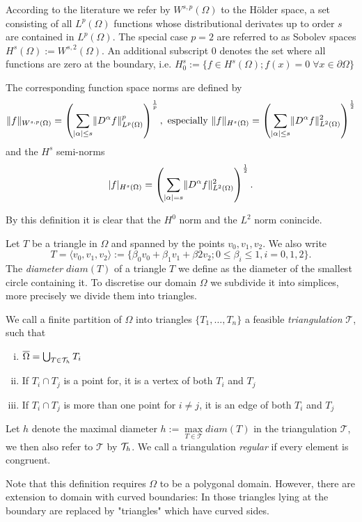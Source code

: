 \begin{definition} \label{def: function spaces and norms}
According to the literature we refer by $W^{s,p}(\Omega)$ to the H\"older space, a set consisting of all $L^p(\Omega)$ functions whose distributional derivates up to order $s$ are contained in $L^ p(\Omega)$.
 The special case $p=2$ are referred to as Sobolev spaces $H^s(\Omega):=W^{s,2}(\Omega)$. An additional subscript $0$ denotes the set where all functions are zero at the boundary, i.e. $H^s_0 :=\{f \in H^s(\Omega); f(x)=0 \; \forall x \in \partial \Omega\}$

The corresponding function space norms are defined by
\[
	\lVert f \rVert _{W^{s,p}(\Omega)} = \left( \sum_{|\alpha| \leq s} \lVert D^\alpha f \rVert^p_{L^p(\Omega)}\right)^{\frac 1 p }, \text{   especially } \lVert f \rVert _{H^{s}(\Omega)}=\left( \sum_{|\alpha| \leq s} \lVert D^\alpha f \rVert^2_{L^2(\Omega)}\right)^{\frac 1 2 }
\]
and the $H^s$ semi-norms
\[ 
 	|f|_{H^{s}(\Omega)}=\left( \sum_{|\alpha| = s} \lVert D^\alpha f \rVert^2_{L^2(\Omega)}\right)^{\frac 1 2 }.
\]
\end{definition}
By this definition it is clear that the $H^0$ norm and the $L^2$ norm conincide.

Let $T$ be a triangle in $\Omega$ and spanned by the points $v_0, v_1, v_2$. We also write 
\[
	T= \langle v_0, v_1, v_2 \rangle := \{\beta_0 v_0+ \beta_1 v_1 +\beta2 v_2; 0 \leq \beta_i \leq 1, i= 0,1,2\}.
\]
The \emph{diameter} $diam(T)$ of a triangle $T$ we define as the diameter of the smallest circle containing it.
To discretise our domain $\Omega$ we subdivide it into simplices, more precisely we divide them into triangles.
\begin{definition}
	We call a finite partition of $\Omega$ into triangles $\{T_1, \dots, T_n\}$ a feasible \emph{triangulation} $\mathcal{T}$, such that
	\begin{enumerate}[(i)]
		\item	$\overline \Omega = \bigcup_{T \in \mathcal{T}_h} T_i$
		\item If $T_i \cap T_j$ is a point for, it is a vertex of both $T_i$ and $T_j$
		\item If $T_i \cap T_j$ is more than one point for $i \neq j$, it is an edge of both $T_i$ and $T_j$
	\end{enumerate}
	Let $h$ denote the maximal diameter $h:= \operatorname{max}\limits_{T\in \mathcal T} diam(T)$ in the triangulation $\mathcal T$, we then also refer to $\mathcal{T}$ by $\mathcal{T}_h$. We call a triangulation \emph{regular} if every element is congruent.
\end{definition}
Note that this definition requires $\Omega$ to be a polygonal domain. However, there are extension to domain with curved boundaries: In those triangles lying at the boundary are replaced by "triangles" which have curved sides. 

